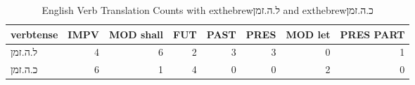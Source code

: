 \begin{table}[htbp!]
\centering
\caption{English Verb Translation Counts with 	exthebrew{ל.ה.זמן} and 	exthebrew{כ.ה.זמן}}
\label{table:clust2_tense_ct}
\begin{tabular}{lrrrrrrr}
\toprule
verbtense &  IMPV &  MOD shall &  FUT &  PAST &  PRES &  MOD let &  PRES PART \\
\midrule
\texthebrew{ל.ה.זמן} &     4 &          6 &    2 &     3 &     3 &        0 &          1 \\
\texthebrew{כ.ה.זמן} &     6 &          1 &    4 &     0 &     0 &        2 &          0 \\
\bottomrule
\end{tabular}
\end{table}
